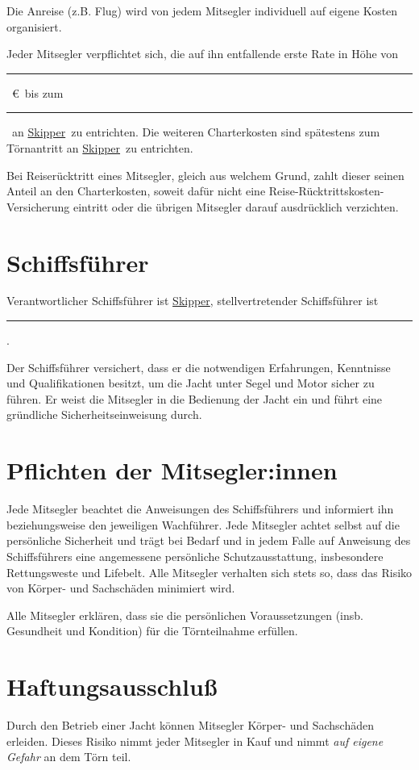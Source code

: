 \documentclass[a4paper,12pt]{article}
\newcommand{\openlength}[1]{\rule{#1}{.4pt}}
\newcommand{\openeuro}{\openlength{2cm}~\euro}
\newcommand{\open}{\openlength{3cm}}
\newcommand{\skipper}{\underline{Skipper}}
\newcommand{\coskipper}{\open}
\newcommand{\paydate}{\open}
\begin{document}
Die Anreise (z.B. Flug) wird von jedem Mitsegler individuell auf eigene Kosten organisiert.

Jeder Mitsegler verpflichtet sich, die auf ihn entfallende erste Rate in Höhe von \openeuro\ bis zum \paydate\ an \skipper\ zu entrichten.
Die weiteren Charterkosten sind spätestens zum Törnantritt an \skipper\ zu entrichten.

Bei Reiserücktritt eines Mitsegler, gleich aus welchem Grund, zahlt dieser seinen Anteil an den Charterkosten, soweit dafür nicht eine Reise-Rücktrittskosten-Versicherung eintritt oder die übrigen Mitsegler darauf ausdrücklich verzichten.


\section{Schiffsführer}
\label{sec:Skipper}

Verantwortlicher Schiffsführer ist \skipper, stellvertretender Schiffsführer ist \coskipper.

Der Schiffsführer versichert, dass er die notwendigen Erfahrungen, Kenntnisse und Qualifikationen besitzt, um die Jacht unter Segel und Motor sicher zu führen.
Er weist die Mitsegler in die Bedienung der Jacht ein und führt eine gründliche Sicherheitseinweisung durch.


\section{Pflichten der Mitsegler:innen}
\label{sec:Pflichten}

Jede Mitsegler beachtet die Anweisungen des Schiffsführers und informiert ihn beziehungsweise den jeweiligen Wachführer.
Jede Mitsegler achtet selbst auf die persönliche Sicherheit und trägt bei Bedarf und in jedem Falle auf Anweisung des Schiffsführers eine angemessene persönliche Schutzausstattung, insbesondere Rettungsweste und Lifebelt.
Alle Mitsegler verhalten sich stets so, dass das Risiko von Körper- und Sachschäden minimiert wird.

Alle Mitsegler erklären, dass sie die persönlichen Voraussetzungen (insb. Gesundheit und Kondition) für die Törnteilnahme erfüllen.


\section{Haftungsausschluß}
\label{sec:Haftung}

Durch den Betrieb einer Jacht können Mitsegler Körper- und Sachschäden erleiden.
Dieses Risiko nimmt jeder Mitsegler in Kauf und nimmt \textit{auf eigene Gefahr} an dem Törn teil.
\end{document}
